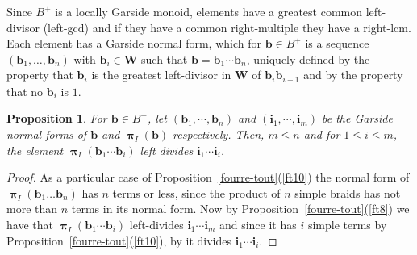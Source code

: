 \documentclass{amsart}
\numberwithin{equation}{section}
\newtheorem{proposition}[equation]{Proposition}
\newcommand\bb{{\mathbf b}}
\newcommand\bi{{\mathbf i}}
\newcommand\bW{{\mathbf W}}
\DeclareMathOperator\bpi{\boldsymbol\pi}
\begin{document}
Since $B^+$ is a locally Garside monoid, elements have a greatest common
left-divisor  (left-gcd) and if they have  a common right-multiple they have a
right-lcm.  Each element has a Garside  normal form, which for  $\bb\in B^+$ is a
sequence $(\bb_1,\ldots,\bb_n)$ with $\bb_i\in\bW$ such that
$\bb=\bb_1\cdots\bb_n$,  uniquely defined by the  property that $\bb_i$ is the
greatest left-divisor in $\bW$ of $\bb_i \bb_{i+1}$ and by the
property that no $\bb_i$ is $1$.
\begin{proposition} \label{normal form}
For $\bb\in  B^+$, let $(\bb_1,\cdots, \bb_n)$ and
$(\bi_1,\cdots,  \bi_m)$ be the Garside  normal forms of $\bb$
and $\bpi_I(\bb)$ respectively. Then, $m\leq n$ and for $1\leq i\leq m$, the element
$\bpi_I(\bb_1\cdots \bb_i)$ left divides $\bi_1\cdots\bi_i$.
\end{proposition}
\begin{proof}
 As  a particular case of Proposition~\ref{fourre-tout}(\ref{ft10})
the normal form of $\bpi_I(\bb_1\ldots \bb_n)$ has $n$ terms or less, since
the product of $n$ simple braids has not more than $n$ terms in its normal
 form. Now by Proposition~\ref{fourre-tout}(\ref{ft8}) we have that $\bpi_I(\bb_1\cdots\bb_i)$
left-divides $\bi_1\cdots\bi_m$ and since it has $i$ simple terms by
Proposition~\ref{fourre-tout}(\ref{ft10}), by
\cite[III, 1.14]{DDGKM} it divides $\bi_1\cdots\bi_i$.
\end{proof}
\end{document}

